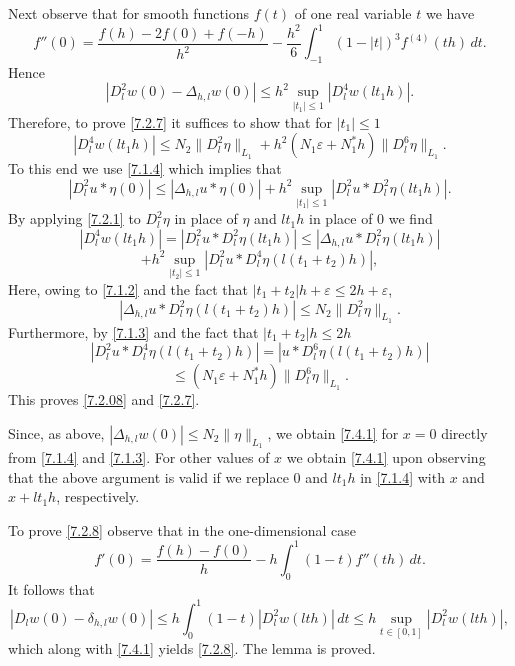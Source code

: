 \documentclass[11pt, reqno]{amsart}
\theoremstyle{definition}
\theoremstyle{remark}
\begin{document}
Next observe that 
for smooth functions $f(t)$ of one real variable $t$ we have
$$
f''(0)=\frac{f(h)-2f(0)+f(-h)}{h^{2}}-\frac{h^{2}}{6}
\int_{-1}^{1}(1-|t|)^{3}f^{(4)}(th)\,dt.
$$
Hence
\begin{equation}
                                             \label{7.1.4}
|D_{l}^{2}w(0)-\Delta_{h,l}w(0)|\leq  h^{2} 
\sup_{|t_{1}|\leq1}|D_{l}^{4}w(lt_{1}h)|.
\end{equation}
Therefore, to prove \eqref{7.2.7} it suffices to show that
for $|t_{1}|\leq1$
\begin{equation}
                                             \label{7.2.08}
|D_{l}^{4}w(lt_{1}h)|\leq N _{2} 
\|D ^{2}_{l}\eta\|_{L_{1}}
+ h^{2}(N_{1}\varepsilon+N_{1}^{*}h)\|D^{6}_{l}\eta\|_{L_{1}}.
\end{equation}
To this end we use \eqref{7.1.4} which implies that
\begin{equation}
                                             \label{7.2.1}
|D_{l}^{2} u*\eta (0)|\leq |\Delta_{h,l} u*\eta (0)|+  h^{2} 
\sup_{|t_{1}|\leq1}|D_{l}^{2} u*D_{l}^{2}\eta (lt_{1}h)|.
\end{equation}
By applying \eqref{7.2.1} to $D^{2 }_{l}\eta$ 
 in place of $\eta$ and $lt_{1}h$ in place of $0$
  we find
$$
|D_{l}^{4}w(lt_{1}h)|=|D_{l}^{2} u*D^{2 }_{l}\eta (lt_{1}h)|
\leq |\Delta_{h,l} u*D^{2 }_{l}\eta (lt_{1}h)|
$$
$$
+  h^{2} 
\sup_{|t_{2}|\leq1}|D_{l}^{2} u*D_{l}^{4}\eta (l(t_{1}+t_{2})h)|,
$$
Here, owing to \eqref{7.1.2} and the fact that $|t_{1}+t_{2}|h
+\varepsilon\leq2h+\varepsilon$,
 $$
|\Delta_{h,l} u*
D^{2}_{l}\eta (l(t_{1}+t_{2})h)|\leq N_{2}\|D^{2}_{l}\eta\|_{L_{1}}.
$$
Furthermore, by \eqref{7.1.3} and the fact that $|t_{1}+t_{2}|h
 \leq2h $
$$
|D_{l}^{2} u*D_{l}^{4}\eta (l(t_{1}+t_{2} )h)|=
|  u*D_{l}^{6}\eta (l(t_{1}+t_{2} )h)|
$$
$$
 \leq
(N_{1}\varepsilon+N_{1}^{*}h)\|D^{6}_{l}\eta\|_{L_{1}}.
$$
This proves \eqref{7.2.08} and \eqref{7.2.7}.
 

Since, as above, $|\Delta_{h,l}w(0)|\leq N_{2}\|\eta\|_{L_{1}}$,
we obtain \eqref{7.4.1} for $x=0$ directly from
\eqref{7.1.4} and \eqref{7.1.3}. For other values of $x$
we obtain \eqref{7.4.1} upon observing that the above argument
is valid if we replace $0$ and $lt_{1}h$ in
\eqref{7.1.4} with $x$ and $x+lt_{1}h$,  respectively.

To prove \eqref{7.2.8}
observe that in the 
one-dimensional case
$$
f'(0)=\frac{f(h)-f(0)}{ h}-h
\int_{0}^{1}(1- t ) f''(th)\,dt.
$$
It follows that
\begin{equation}
                                                        \label{7.8.6}
|D_{l}w(0)- \delta_{h,l} w(0)|\leq
h
\int_{0}^{1}(1- t ) |D_{l}^{2}w (lth)|\,dt
\leq h\sup_{t\in[0,1]}|D_{l}^{2}w (lth)|,
\end{equation}
which along with \eqref{7.4.1} yields \eqref{7.2.8}.
The lemma is proved.  
\end{document}
